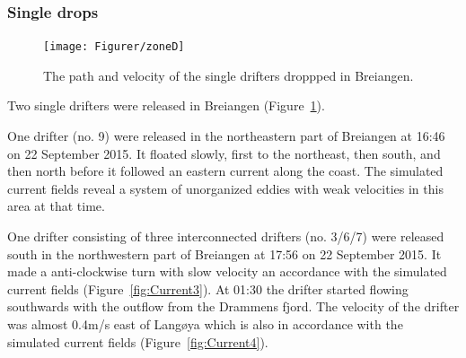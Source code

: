 \documentclass[12pt,a4paper,english]{article}
\begin{document}
\subsubsection{Single drops}
%
\begin{figure}[ht]
\centerline{
\texttt{[image: Figurer/zoneD]}}
\caption{\small
The path and velocity of the single drifters droppped in Breiangen.}
\label{fig:ZoneD}
\end{figure}
%
%
Two single drifters were released in Breiangen (Figure~\ref{fig:ZoneD}).

One drifter (no. 9) were released in the northeastern part of Breiangen at 16:46 on 22 September 2015. It floated slowly, first to the northeast, then south, and then north before it followed an eastern current along the coast. The simulated current fields reveal a system of unorganized eddies with weak velocities in this area at that time.

One drifter consisting of three interconnected drifters (no. 3/6/7) were released south in the northwestern part of Breiangen at 17:56 on 22 September 2015. It made a anti-clockwise turn with slow velocity an accordance with the simulated current fields (Figure~\ref{fig:Current3}). At 01:30 the drifter started flowing southwards with the outflow from the Drammens fjord. The velocity of the drifter was almost 0.4m/s east of Lang\o ya which is also in accordance with the simulated current fields (Figure~\ref{fig:Current4}).   


%
%
%
\end{document}
